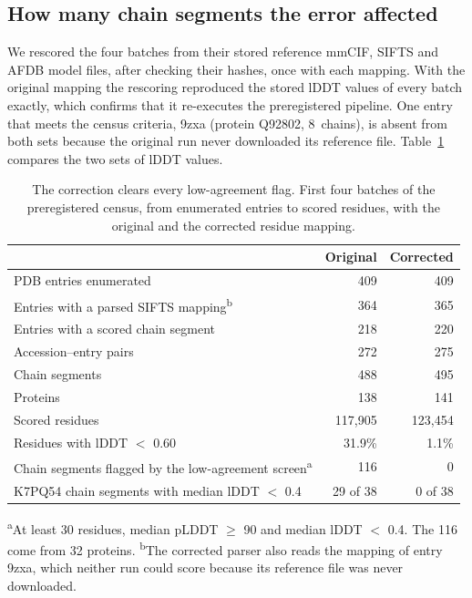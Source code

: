 \documentclass{article}
\begin{document}
\subsection{How many chain segments the error affected}
\label{sec:scope}

We rescored the four batches from their stored reference mmCIF, SIFTS and
AFDB model files, after checking their hashes, once with each mapping. With
the original mapping the rescoring reproduced the stored lDDT values of
every batch exactly, which confirms that it re-executes the preregistered
pipeline. One entry that meets the census criteria, 9zxa (protein Q92802,
8~chains), is absent from both sets because the original run never
downloaded its reference file. Table~\ref{tab:scope} compares the two sets of
lDDT values.

\begin{table}[tbp]
\centering
\caption{The correction clears every low-agreement flag. First four batches of the preregistered census, from enumerated entries to scored residues, with the original and the corrected residue mapping.}
\label{tab:scope}
\begin{tabular}{lrr}
\toprule
 & Original & Corrected \\
\midrule
PDB entries enumerated & 409 & 409 \\
Entries with a parsed SIFTS mapping\textsuperscript{b} & 364 & 365 \\
Entries with a scored chain segment & 218 & 220 \\
Accession--entry pairs & 272 & 275 \\
Chain segments & 488 & 495 \\
Proteins & 138 & 141 \\
Scored residues & 117{,}905 & 123{,}454 \\
\midrule
Residues with lDDT $<$ 0.60 & 31.9\% & 1.1\% \\
Chain segments flagged by the low-agreement screen\textsuperscript{a} & 116 & 0 \\
K7PQ54 chain segments with median lDDT $<$ 0.4 & 29 of 38 & 0 of 38 \\
\bottomrule
\end{tabular}

\smallskip
\footnotesize \textsuperscript{a}At least 30 residues, median pLDDT $\ge$ 90
and median lDDT $<$ 0.4. The 116 come from 32 proteins. \textsuperscript{b}The corrected parser also reads the mapping of entry 9zxa, which neither run could score because its reference file was never downloaded.
\end{table}
\end{document}
